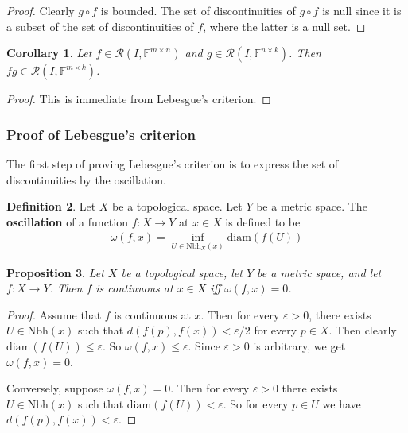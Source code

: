 \documentclass[12pt,b5paper,notitlepage]{article}
\theoremstyle{definition}
\newtheorem{df}{Definition}[section]
\theoremstyle{plain}
\newtheorem{pp}[df]{Proposition}
\newtheorem{co}[df]{Corollary}
\newcommand{\scr}{\mathscr}
\newcommand{\Fbb}{\mathbb F}
\newcommand{\Nbh}{\mathrm{Nbh}}
\newcommand{\diam}{\mathrm{diam}}
\newcommand{\eps}{\varepsilon}
\numberwithin{equation}{section}
\begin{document}
\begin{proof}
Clearly $g\circ f$ is bounded. The set of discontinuities of $g\circ f$ is null since it is a subset of the set of discontinuities of $f$, where the latter is a null set.
\end{proof}


\begin{co}
Let $f\in\scr R(I,\Fbb^{m\times n})$ and $g\in\scr R(I,\Fbb^{n\times k})$. Then $fg\in\scr R(I,\Fbb^{m\times k})$.
\end{co}

\begin{proof}
This is immediate from Lebesgue's criterion.
\end{proof}


\subsubsection{Proof of Lebesgue's criterion}


The first step of proving Lebesgue's criterion is to express the set of discontinuities by the oscillation.

\begin{df}\label{lb462}
Let $X$ be a topological space. Let $Y$ be a metric space. The \textbf{oscillation}   of a function $f:X\rightarrow Y$ at $x\in X$ is defined to be
\begin{align*}
\omega(f,x)=\inf_{U\in\Nbh_X(x)}\diam(f(U))
\end{align*}
\end{df}


\begin{pp}\label{lb461}
Let $X$ be a topological space, let $Y$ be a metric space, and let $f:X\rightarrow Y$. Then  $f$ is continuous at $x\in X$ iff $\omega(f,x)=0$.
\end{pp}


\begin{proof}
Assume that $f$ is continuous at $x$. Then for every $\eps>0$, there exists $U\in\Nbh(x)$ such that $d(f(p),f(x))<\eps/2$ for every $p\in X$. Then clearly $\diam(f(U))\leq\eps$. So $\omega(f,x)\leq \eps$. Since $\eps>0$ is arbitrary, we get $\omega(f,x)=0$.

Conversely, suppose $\omega(f,x)=0$. Then for every $\eps>0$ there exists $U\in\Nbh(x)$ such that $\diam(f(U))<\eps$. So for every $p\in U$ we have $d(f(p),f(x))<\eps$.
\end{proof}
\end{document}
